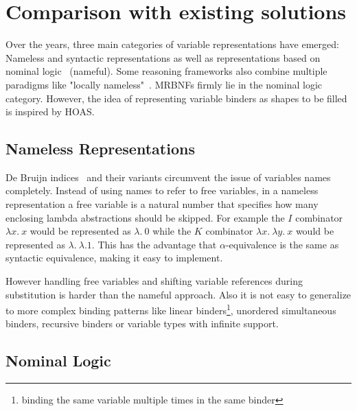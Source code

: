 \chapter{Comparison with existing solutions}\label{chapter:comparison}

Over the years, three main categories of variable representations have emerged: Nameless and syntactic representations as well as representations based on nominal logic~\cite{nominal_logic} (nameful). Some reasoning frameworks also combine multiple paradigms like "locally nameless"~\cite{locally_nameless}. \acp{MRBNF} firmly lie in the nominal logic category. However, the idea of representing variable binders as shapes to be filled is inspired by \ac{HOAS}.

\section{Nameless Representations}

De Bruijn indices~\cite{deBruijn} and their variants circumvent the issue of variables names completely. Instead of using names to refer to free variables, in a nameless representation a free variable is a natural number that specifies how many enclosing lambda abstractions should be skipped. For example the $I$ combinator $\lambda x. \: x$ would be represented as $\lambda. \: 0$ while the $K$ combinator $\lambda x. \: \lambda y. \: x$ would be represented as $\lambda. \: \lambda. 1$. This has the advantage that $\alpha$-equivalence is the same as syntactic equivalence, making it easy to implement.

However handling free variables and shifting variable references during substitution is harder than the nameful approach. Also it is not easy to generalize to more complex binding patterns like linear binders\footnote{binding the same variable multiple times in the same binder}, unordered simultaneous binders, recursive binders or variable types with infinite support.

\section{Nominal Logic}

